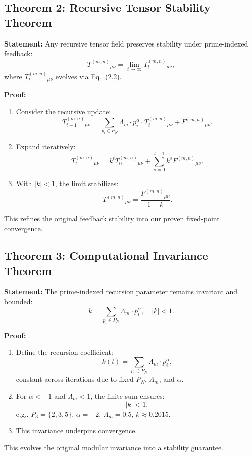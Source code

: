\documentclass{article}
\theoremstyle{plain}
\begin{document}
\subsection{Theorem 2: Recursive Tensor Stability Theorem}
\textbf{Statement:} Any recursive tensor field preserves stability under prime-indexed feedback:
\begin{equation}
    T^{(m,n)}{}_{\mu\nu} = \lim_{t \to \infty} T_t^{(m,n)}{}_{\mu\nu},
\end{equation}
where \( T_t^{(m,n)}{}_{\mu\nu} \) evolves via Eq.~(2.2).

\textbf{Proof:}
\begin{enumerate}
    \item Consider the recursive update:
    \[
    T_{t+1}^{(m,n)}{}_{\mu\nu} = \sum_{p_i \in P_N} \Lambda_m \cdot p_i^\alpha \cdot T_t^{(m,n)}{}_{\mu\nu} + F^{(m,n)}{}_{\mu\nu}.
    \]
    \item Expand iteratively:
    \[
    T_t^{(m,n)}{}_{\mu\nu} = k^t T_0^{(m,n)}{}_{\mu\nu} + \sum_{s=0}^{t-1} k^s F^{(m,n)}{}_{\mu\nu}.
    \]
    \item With \( |k| < 1 \), the limit stabilizes:
    \[
    T^{(m,n)}{}_{\mu\nu} = \frac{F^{(m,n)}{}_{\mu\nu}}{1 - k}.
    \]
\end{enumerate}
This refines the original feedback stability into our proven fixed-point convergence.

\subsection{Theorem 3: Computational Invariance Theorem}
\textbf{Statement:} The prime-indexed recursion parameter remains invariant and bounded:
\begin{equation}
    k = \sum_{p_i \in P_N} \Lambda_m \cdot p_i^\alpha, \quad |k| < 1.
\end{equation}

\textbf{Proof:}
\begin{enumerate}
    \item Define the recursion coefficient:
    \[
    k(t) = \sum_{p_i \in P_N} \Lambda_m \cdot p_i^\alpha,
    \]
    constant across iterations due to fixed \( P_N \), \( \Lambda_m \), and \( \alpha \).
    \item For \( \alpha < -1 \) and \( \Lambda_m < 1 \), the finite sum ensures:
    \[
    |k| < 1,
    \]
    e.g., \( P_3 = \{2, 3, 5\} \), \( \alpha = -2 \), \( \Lambda_m = 0.5 \), \( k \approx 0.2015 \).
    \item This invariance underpins convergence.
\end{enumerate}
This evolves the original modular invariance into a stability guarantee.
\end{document}
